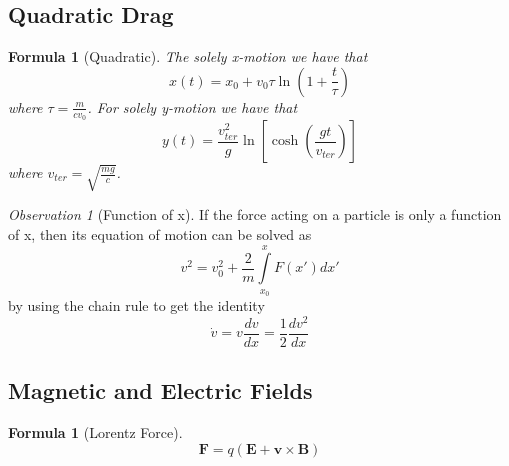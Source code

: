 \documentclass[12pt]{article}
\newtheorem{for}[thm]{Formula}
\theoremstyle{definition}
\theoremstyle{remark}
\newtheorem{obs}[thm]{Observation}
\numberwithin{equation}{section}
\newcommand\B[1]{\textbf{#1}}
\begin{document}
\vspace{15pt}

\subsection{Quadratic Drag}


\begin{for}[Quadratic]
        The solely x-motion we have that \begin{equation}
                x(t) = x_0 +v_0\tau \ln\left(1+\frac{t}{\tau}\right)
        \end{equation}
        where $\tau = \frac{m}{cv_0}$. For solely y-motion we have that \begin{equation}
                y(t) = \frac{v_{ter}^2}{g}\ln\left[\cosh\left(\frac{gt}{v_{ter}}\right)\right]
        \end{equation}
        where $v_{ter} = \sqrt{\frac{mg}{c}}$.
\end{for}


\vspace{15pt}


\begin{obs}[Function of x]
        If the force acting on a particle is only a function of x, then its equation of motion can be solved as \begin{equation}
                v^2 = v_0^2 + \frac{2}{m}\int\limits_{x_0}^xF(x')dx'
        \end{equation}
        by using the chain rule to get the identity \begin{equation}
                \dot{v} = v\frac{dv}{dx} = \frac{1}{2}\frac{dv^2}{dx}
        \end{equation}
\end{obs}


\vspace{15pt}

\subsection{Magnetic and Electric Fields}



\begin{for}[Lorentz Force]
        \begin{equation}
                \B{F} = q(\B{E} + \B{v}\times\B{B})
        \end{equation}
\end{for}


\vspace{15pt}
\end{document}
